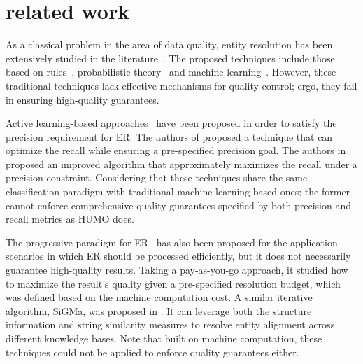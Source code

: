 \section{related work} \label{sec:related}

  As a classical problem in the area of data quality, entity resolution has been extensively studied in the literature~\cite{christen2012data, elmagarmid2007duplicate, christophides2015entity}. The proposed techniques include those based on rules~\cite{fan2009reasoning, li2015rule, singh2017generating}, probabilistic theory~\cite{fellegi1969theory, singla2006entity} and machine learning~\cite{sarawagi2002interactive, kouki2017collective, arasu2010active, bellare2012active}. However, these traditional techniques lack effective mechanisms for quality control; ergo, they fail in ensuring high-quality guarantees.

  Active learning-based approaches~\cite{arasu2010active, bellare2012active} have been proposed in order to satisfy the precision requirement for ER. The authors of \cite{arasu2010active} proposed a technique that can optimize the recall while ensuring a pre-specified precision goal. The authors in~\cite{bellare2012active} proposed an improved algorithm that approximately maximizes the recall under a precision constraint. Considering that these techniques share the same classification paradigm with traditional machine learning-based ones; the former cannot enforce comprehensive quality guarantees specified by both precision and recall metrics as HUMO does.

   The progressive paradigm for ER~\cite{whang2013pay, altowim2014progressive} has also been proposed for the application scenarios in which ER should be processed efficiently, but it does not necessarily guarantee high-quality results. Taking a pay-as-you-go approach, it studied how to maximize the result's quality given a pre-specified resolution budget, which was defined based on the machine computation cost. A similar iterative algorithm, SiGMa, was proposed in \cite{lacoste2013sigma}. It can leverage both the structure information and string similarity measures to resolve entity alignment across different knowledge bases. Note that built on machine computation, these techniques could not be applied to enforce quality guarantees either.

